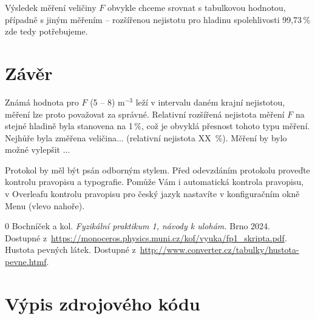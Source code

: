 \documentclass[a4paper,11pt]{article}
\begin{document}
Výsledek měření veličiny $F$ obvykle chceme srovnat s tabulkovou hodnotou, případně s jiným měřením -- rozšířenou nejistotu pro hladinu spolehlivosti 99,73\,\% zde tedy potřebujeme.

\section{Závěr}
Známá hodnota pro $F$ (5 -- 8) m$^{-3}$ \cite{tabulky} leží v intervalu daném krajní nejistotou, měření lze proto považovat za správné.  Relativní rozšířená nejistota měření $F$ na stejné hladině byla stanovena na 1\,\%, což je obvyklá přesnost tohoto typu měření. Nejhůře byla změřena veličina... (relativní nejistota XX~\%). Měření by bylo možné vylepšit ...

Protokol by měl být psán odborným stylem. Před odevzdáním protokolu proveďte kontrolu pravopisu a typografie. Pomůže Vám i automatická kontrola pravopisu, v  Overleafu kontrolu pravopisu pro český jazyk nastavíte v konfiguračním okně Menu (vlevo nahoře).

\begin{thebibliography}{0}
 Bochníček a kol. \textit{Fyzikální praktikum 1, návody k ulohám.} Brno 2024.\\ Dostupné z~\url{https://monoceros.physics.muni.cz/kof/vyuka/fp1_skripta.pdf}.   
 Hustota pevných látek. Dostupné z~\url{http://www.converter.cz/tabulky/hustota-pevne.htmf}.   
\end{thebibliography}


\newpage\appendix
\section{Výpis zdrojového kódu}\label{sc:zdrojkod}

\end{document}
